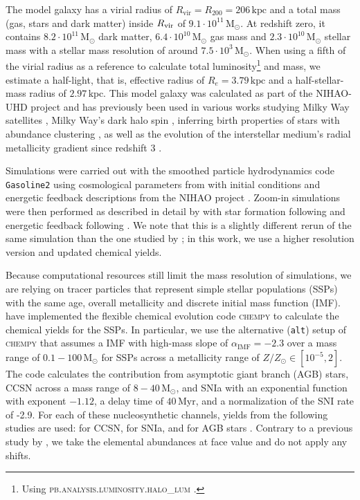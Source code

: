 \documentclass[fleqn,usenatbib]{mnras}
\begin{document}
The model galaxy has a virial radius of $R_\mathrm{vir} = R_{200}=206\,\mathrm{kpc}$ and a total mass (gas, stars and dark matter) inside $R_{\rm vir}$ of $9.1 \cdot 10^{11}\,\mathrm{M_\odot}$. At redshift zero, it contains $8.2 \cdot 10^{11}\,\mathrm{M_\odot}$ dark matter, $6.4 \cdot 10^{10}\,\mathrm{M_\odot}$ gas mass and $2.3 \cdot 10^{10}\,\mathrm{M_\odot}$ stellar mass with a stellar mass resolution of around $7.5 \cdot 10^{3}\,\mathrm{M_\odot}$. When using a fifth of the virial radius as a reference to calculate total luminosity\footnote{Using \textsc{pb.analysis.luminosity.halo\_lum} \citep{pynbody}.} and mass, we estimate a half-light, that is, effective radius of $R_e = 3.79\,\mathrm{kpc}$ and a half-stellar-mass radius of $\mathrm{2.97\,\mathrm{kpc}}$. This model galaxy was calculated as part of the NIHAO-UHD project \citep{Buck2020b} and has previously been used in various works studying Milky Way satellites \citep{Buck2019b}, Milky Way's dark halo spin \citep{Obreja2022}, inferring birth properties of stars with abundance clustering \citep{Ratcliffe2022}, as well as the evolution of the interstellar medium's radial metallicity gradient since redshift 3 \citep{Ratcliffe2024b}.

Simulations were carried out with the smoothed particle hydrodynamics code \texttt{Gasoline2} \citep{Wadsley2017} using cosmological parameters from \citet{Planck2014} with initial conditions and energetic feedback descriptions from the NIHAO project \citep{Wang2015}. Zoom-in simulations were then performed as described in detail by \citet{Buck2021} with star formation following \citet{Stinson2006} and energetic feedback following \citet{Stinson2013}. We note that this is a slightly different rerun of the same simulation than the one studied by \citet{Buder2024}; in this work, we use a higher resolution version and updated chemical yields.

Because computational resources still limit the mass resolution of simulations, we are relying on tracer particles that represent simple stellar populations (SSPs) with the same age, overall metallicity and discrete initial mass function (IMF). \citet{Buck2021} have implemented the flexible chemical evolution code \textsc{chempy} \citep{Rybizki2017} to calculate the chemical yields for the SSPs. In particular, we use the alternative (\texttt{alt}) setup of \textsc{chempy} that assumes a \citet{Chabrier2003} IMF with high-mass slope of $\alpha_\text{IMF} = -2.3$ over a mass range of $0.1-100\,\mathrm{M_\odot}$ for SSPs across a metallicity range of $Z/Z_\odot \in [10^{-5},2]$. The code calculates the contribution from asymptotic giant branch (AGB) stars, CCSN across a mass range of $8-40\,\mathrm{M_\odot}$, and SNIa with an exponential function with exponent $-1.12$, a delay time of $40\,\mathrm{Myr}$, and a normalization of the SNI rate of -2.9. For each of these nucleosynthetic channels, yields from the following studies are used: \citet{Chieffi2004} for CCSN, \citet{Seitenzahl2013} for SNIa, and \citet{Karakas2016} for AGB stars \citep[\texttt{new\_fit} model in][]{Buck2021}. Contrary to a previous study by \citet{Buder2024}, we take the elemental abundances at face value and do not apply any shifts.
\end{document}
